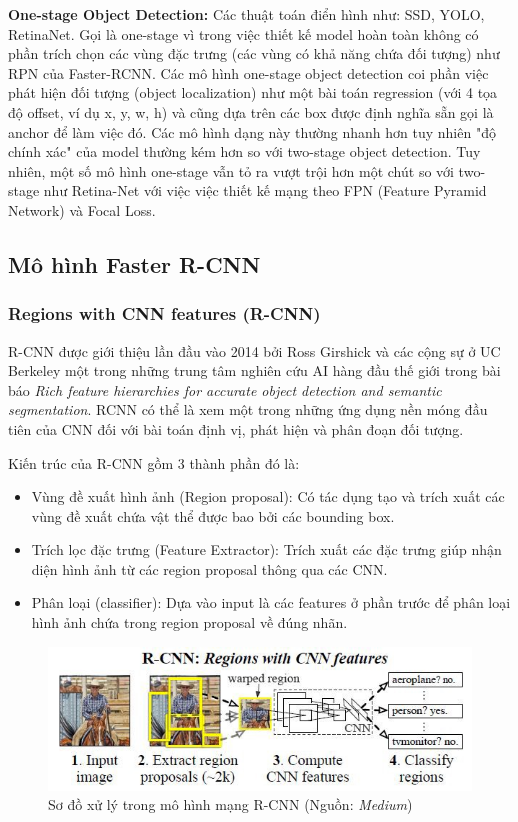 \documentclass[a4paper, 12pt]{report}
\begin{document}
\textbf{One-stage Object Detection:} Các thuật toán điển hình như: SSD, YOLO, RetinaNet. Gọi là one-stage vì trong việc thiết kế model hoàn toàn không có phần trích chọn các vùng đặc trưng (các vùng có khả năng chứa đối tượng) như RPN của Faster-RCNN. Các mô hình one-stage object detection coi phần việc phát hiện đối tượng (object localization) như một bài toán regression (với 4 tọa độ offset, ví dụ x, y, w, h) và cũng dựa trên các box được định nghĩa sẵn gọi là anchor để làm việc đó. Các mô hình dạng này thường nhanh hơn tuy nhiên "độ chính xác" của model thường kém hơn so với two-stage object detection. Tuy nhiên, một số mô hình one-stage vẫn tỏ ra vượt trội hơn một chút so với two-stage như Retina-Net với việc việc thiết kế mạng theo FPN (Feature Pyramid Network) và Focal Loss.\par
\subsection{Mô hình Faster R-CNN}
\subsubsection{Regions with CNN features (R-CNN)}
R-CNN được giới thiệu lần đầu vào 2014 bởi Ross Girshick và các cộng sự ở UC Berkeley một trong những trung tâm nghiên cứu AI hàng đầu thế giới trong bài báo \textit{Rich feature hierarchies for accurate object detection and semantic segmentation}. RCNN có thể là xem một trong những ứng dụng nền móng đầu tiên của CNN đối với bài toán định vị, phát hiện và phân đoạn đối tượng. \par
Kiến trúc của R-CNN gồm 3 thành phần đó là:
\begin{itemize}
	\item Vùng đề xuất hình ảnh (Region proposal): Có tác dụng tạo và trích xuất các vùng đề xuất chứa vật thể được bao bởi các bounding box.
	\item Trích lọc đặc trưng (Feature Extractor): Trích xuất các đặc trưng giúp nhận diện hình ảnh từ các region proposal thông qua các CNN.
	\item Phân loại (classifier): Dựa vào input là các features ở phần trước để phân loại hình ảnh chứa trong region proposal về đúng nhãn.
\end{itemize}\par
\begin{figure}[h!]
	\centering
	\includegraphics[width=1\linewidth]{Images/rcnn}
	\caption{Sơ đồ xử lý trong mô hình mạng R-CNN (Nguồn: \textit{Medium})}
	\label{fig:rcnn}
\end{figure}
\end{document}
